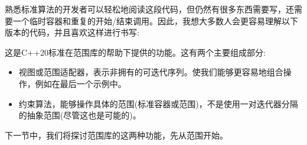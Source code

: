 熟悉标准算法的开发者可以轻松地阅读这段代码，但仍然有很多东西需要写，还需要一个临时容器和重复的开始/结束调用。因此，我想大多数人会更容易理解以下版本的代码，并且喜欢这样进行书写:


这是C++20标准在范围库的帮助下提供的功能。这有两个主要组成部分:

\begin{itemize}
\item
视图或范围适配器，表示非拥有的可迭代序列。使我们能够更容易地组合操作，例如在最后一个示例中。

\item
约束算法，能够操作具体的范围(标准容器或范围)，不是使用一对迭代器分隔的抽象范围(尽管这也是可能的)。
\end{itemize}

下一节中，我们将探讨范围库的这两种功能，先从范围开始。

